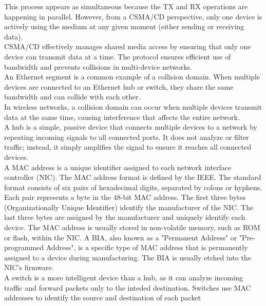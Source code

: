 \documentclass[parindent=0pt]{article}
\begin{document}
This process appears as simultaneous because the TX and RX operations are happening in parallel. However, from a CSMA/CD perspective, only one device is actively using the medium at any given moment (either sending or receiving data).\\

CSMA/CD effectively manages shared media access by ensuring that only one device can transmit data at a time. The protocol ensures efficient use of bandwidth and prevents collisions in multi-device networks.\\

An Ethernet segment is a common example of a collision domain. When multiple devices are connected to an Ethernet hub or switch, they share the same bandwidth and can collide with each other.\\

In wireless networks, a collision domain can occur when multiple devices transmit data at the same time, causing interference that affects the entire network.\\

A hub is a simple, passive device that connects multiple devices to a network by repeating incoming signals to all connected ports. It does not analyze or filter traffic; instead, it simply amplifies the signal to ensure it reaches all connected devices.\\

A MAC address is a unique identifier assigned to each network interface controller (NIC). The MAC address format is defined by the IEEE. The standard format consists of six pairs of hexadecimal digits, separated by colons or hyphens. Each pair represents a byte in the 48-bit MAC address. The first three bytes (Organizationally Unique Identifier) identify the manufacturer of the NIC. The last three bytes are assigned by the manufacturer and uniquely identify each device. The MAC address is usually stored in non-volatile memory, such as ROM or flash, within the NIC. A BIA, also known as a "Permanent Address" or "Pre-programmed Address", is a specific type of MAC address that is permanently assigned to a device during manufacturing. The BIA is usually etched into the NIC's firmware.\\

A switch is a more intelligent device than a hub, as it can analyze incoming traffic and forward packets only to the inteded destination. Switches use MAC addresses to identify the source and destination of each packet\\
\end{document}
